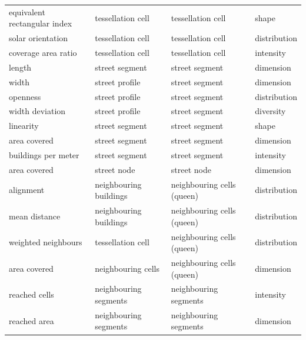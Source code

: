 \begin{longtable}{p{5cm}p{4cm}p{4cm}l}
            equivalent rectangular index &               tessellation cell &          tessellation cell &        shape \\
                       solar orientation &               tessellation cell &          tessellation cell & distribution \\
                     coverage area ratio &               tessellation cell &          tessellation cell &    intensity \\
                                  length &                  street segment &             street segment &    dimension \\
                                   width &                  street profile &             street segment &    dimension \\
                                openness &                  street profile &             street segment & distribution \\
                         width deviation &                  street profile &             street segment &    diversity \\
                               linearity &                  street segment &             street segment &        shape \\
                            area covered &                  street segment &             street segment &    dimension \\
                     buildings per meter &                  street segment &             street segment &    intensity \\
                            area covered &                     street node &                street node &    dimension \\
                               alignment &          neighbouring buildings & neighbouring cells (queen) & distribution \\
                           mean distance &          neighbouring buildings & neighbouring cells (queen) & distribution \\
                     weighted neighbours &               tessellation cell & neighbouring cells (queen) & distribution \\
                            area covered &              neighbouring cells & neighbouring cells (queen) &    dimension \\
                           reached cells &           neighbouring segments &      neighbouring segments &    intensity \\
                            reached area &           neighbouring segments &      neighbouring segments &    dimension \\

\end{longtable}
